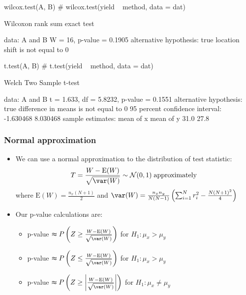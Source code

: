 \documentclass[a4paper]{article}
\begin{document}
\begin{Schunk}
\begin{Sinput}
wilcox.test(A, B) # wilcox.test(yield ~ method, data = dat)
\end{Sinput}
\begin{Soutput}

	Wilcoxon rank sum exact test

data:  A and B
W = 16, p-value = 0.1905
alternative hypothesis: true location shift is not equal to 0
\end{Soutput}
\begin{Sinput}
t.test(A, B) # t.test(yield ~ method, data = dat)
\end{Sinput}
\begin{Soutput}

	Welch Two Sample t-test

data:  A and B
t = 1.633, df = 5.8232, p-value = 0.1551
alternative hypothesis: true difference in means is not equal to 0
95 percent confidence interval:
 -1.630468  8.030468
sample estimates:
mean of x mean of y 
     31.0      27.8 
\end{Soutput}
\end{Schunk}
\subsubsection{Normal approximation}
	\begin{itemize}
		\item We can use a normal approximation to the distribution of test statistic:
		\[
			T = \frac{W - \mathrm{E}(W)}{\sqrt{\var (W)}} \sim \mathcal{N}(0,1) \;\text{approximately}
		\]
		where \( \mathrm{E}(W) = \frac{n_x (N+1)}{2} \) and \( \var (W) = \frac{n_x n_y}{N(N-1)} \left( \sum_{i=1}^{N} r_{i}^{2} - \frac{N (N+1)^2}{4} \right) \) 
		\item Our p-value calculations are:
		\begin{itemize}
			\item p-value \( \thickapprox P\left( Z \geq \frac{W-\mathrm{E}(W)}{\sqrt{\var(W)}} \right) \) for \( H_1: \mu_x > \mu_y \) 
			\item p-value \( \thickapprox P\left( Z \leq \frac{W-\mathrm{E}(W)}{\sqrt{\var(W)}} \right) \) for \( H_1: \mu_x > \mu_y \) 
			\item p-value \( \thickapprox P\left( Z \geq \left\vert \frac{W-\mathrm{E}(W)}{\sqrt{\var(W)}} \right\vert \right) \) for \( H_1: \mu_x \neq \mu_y \) 
		\end{itemize}
	\end{itemize}
\end{document}
